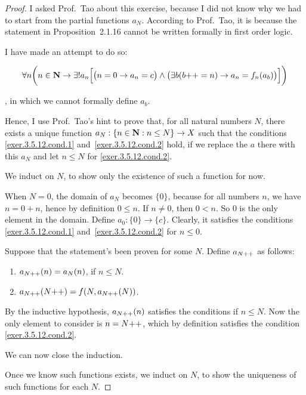 \noindent{}
\begin{proof}
	I asked Prof.~Tao about this exercise, because I did not know why we had to start from the partial functions $a_N$. According to Prof.~Tao, it is because the statement in Proposition~2.1.16 cannot be written formally in first order logic.
	
	I have made an attempt to do so:
		
	\begin{equation}
		\forall n\bigg(n \in \mathbf{N} \to \exists!a_n\Bigl[\bigl(n = 0 \to a_n = c\bigr) \wedge \bigl(\exists b(b{+}{+} = n) \to a_n = f_n(a_b)\bigr)\Bigr]\bigg) \label{prop.2.1.16.formal.stat.1}
	\end{equation}
	
	, in which we cannot formally define $a_b$.
	
	Hence, I use Prof.~Tao's hint to prove that, for all natural numbers $N$, there exists a unique function $a_N : \{n \in \mathbf{N} : n \le N\} \to X$ such that the conditions \eqref{exer.3.5.12.cond.1} and~\eqref{exer.3.5.12.cond.2} hold, if we replace the $a$ there with this $a_N$ and let $n \le N$ for \eqref{exer.3.5.12.cond.2}.
	
	 We induct on $N$, to show only the existence of such a function for now.
	
	\mybcbox When $N = 0$, the domain of $a_N$ becomes $\{0\}$, because for all numbers $n$, we have $n = 0 + n$, hence by definition $0 \le n$. If $n \ne 0$, then $0 < n$. So $0$ is the only element in the domain. Define $a_0: \{0\} \to \{c\}$. Clearly, it satisfies the conditions \eqref{exer.3.5.12.cond.1} and~\eqref{exer.3.5.12.cond.2} for $n \le 0$.
	
	\myisbox Suppose that the statement's been proven for some $N$. Define $a_{N{+}{+}}$ as follows:
	\begin{enumerate}
		\item $a_{N{+}{+}}(n) = a_N(n)$, if $n \le N$.
		\item $a_{N{+}{+}}(N{+}{+}) = f(N,a_{N{+}{+}}(N))$.
	\end{enumerate}
	By the inductive hypothesis, $a_{N{+}{+}}(n)$ satisfies the conditions if $n \le N$. Now the only element to consider is $n = N{+}{+}$, which by definition satisfies the condition \eqref{exer.3.5.12.cond.2}.
	
	We can now close the induction. \hfill \qedsymbol
	
	 Once we know such functions exists, we induct on $N$, to show the uniqueness of such functions for each $N$.
	

\end{proof}

